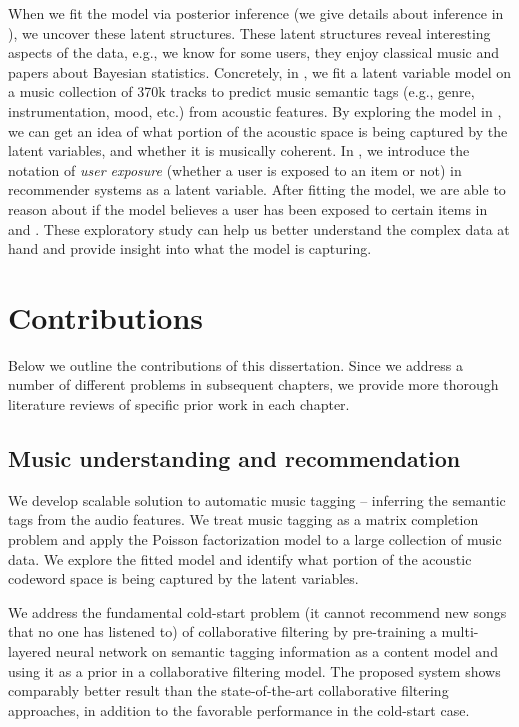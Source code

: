 When we fit the model via posterior inference (we give details about inference in ), we uncover these latent structures. These latent structures reveal interesting aspects of the data, e.g., we know for some users, they enjoy classical music and papers about Bayesian statistics. Concretely, in , we fit a latent variable model on a music collection of 370k tracks to predict music semantic tags (e.g., genre, instrumentation, mood, etc.) from acoustic features. By exploring the model in , we can get an idea of what portion of the acoustic space is being captured by the latent variables, and whether it is musically coherent. In , we introduce the notation of \textit{user exposure} (whether a user is exposed to an item or not) in recommender systems as a latent variable. After fitting the model, we are able to reason about if the model believes a user has been exposed to certain items in  and . These exploratory study can help us better understand the complex data at hand and provide insight into what the model is capturing. 

\section{Contributions}\label{chpt:intro:sec:contribution}
Below we outline the contributions of this dissertation. Since we address a number of different problems in subsequent chapters, we provide more thorough literature reviews of specific prior work in each chapter.

\subsection{Music understanding and recommendation}
We develop scalable solution to automatic music tagging -- inferring the semantic tags from the audio features. We treat music tagging as a matrix completion problem and apply the Poisson factorization model to a large collection of music data. We explore the fitted model and identify what portion of the acoustic codeword space is being captured by the latent variables.

We address the fundamental cold-start problem (it cannot recommend new songs that no one has listened to) of collaborative filtering by pre-training a multi-layered neural network on semantic tagging information as a content model and using it as a prior in a collaborative filtering model.  The proposed system shows comparably better result than the state-of-the-art collaborative filtering approaches, in addition to the favorable performance in the cold-start case. 

